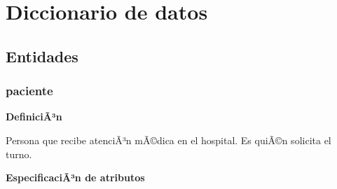 \documentclass[a4paper,11pt]{article}
\begin{document}
\FloatBarrier


%
%
%


\section{\textbf{Diccionario de datos}}

\subsection{\textbf{Entidades}}

\subsubsection{\textbf{paciente}}

\textbf{DefiniciÃ³n}

Persona que recibe atenciÃ³n mÃ©dica en el hospital. Es quiÃ©n solicita el turno. 

\textbf{EspecificaciÃ³n de atributos}
\end{document}

